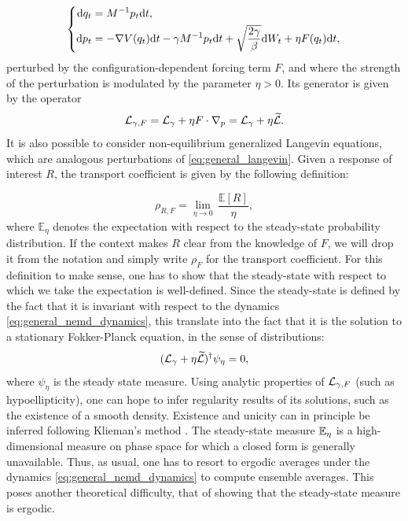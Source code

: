\begin{equation}
    \label{eq:general_nemd_dynamics}
    \left\{\begin{aligned}
        \text dq_t&=M^{-1}p_t\mathrm{d}t,\\
        \text dp_t&= -\nabla V(q_t)\mathrm{d}t -\gamma M^{-1}p_t\mathrm{d}t+\sqrt{\frac{2\gamma}\beta}\text dW_t +\eta F(q_t)\mathrm{d} t,
    \end{aligned}\right.
\end{equation}
perturbed by the configuration-dependent forcing term $F$, and where the strength of the perturbation is modulated by the parameter $\eta>0$.
Its generator is given by the operator 
\begin{equation}
    \label{eq:nemd_generator}
    \mathcal{L}_{\gamma,F}=\mathcal{L}_\gamma +\eta F\cdot \nabla_p = \mathcal{L}_\gamma +\eta \widetilde{\mathcal{L}}.
\end{equation}
It is also possible to consider non-equilibrium generalized Langevin equations, which are analogous perturbations of \eqref{eq:general_langevin}.
Given a response of interest $R$, the transport coefficient is given by the following definition:

\begin{equation}
    \label{eq:transport_coefficient}
    \rho_{R,F}=\underset{\eta \to 0}{\lim}\, \frac{\mathbb{E}[R]}{\eta},
\end{equation}
where $\mathbb{E}_\eta$ denotes the expectation with respect to the steady-state probability distribution. 
If the context makes $R$ clear from the knowledge of $F$, we will drop it from the notation and simply write $\rho_F$ for the transport coefficient.
For this definition to make sense, one has to show that the steady-state with respect to which we take the expectation is well-defined.
Since the steady-state is defined by the fact that it is invariant with respect to the dynamics \eqref{eq:general_nemd_dynamics}, 
this translate into the fact that it is the solution to a stationary Fokker-Planck equation, in the sense of distributions:
\begin{equation}
    \label{eq:nemd_fp_equation}
    (\mathcal{L}_\gamma +\eta \widetilde{\mathcal{L}})^\dagger \psi_\eta = 0,
\end{equation}
where $\psi_\eta$ is the steady state measure. Using analytic properties of $\mathcal{L}_{\gamma,F}$ (such as hypoellipticity), one can hope to infer regularity results of its solutions, such as the existence of a smooth density.
Existence and unicity can in principle be inferred following Klieman's method \cite{K87}. 
The steady-state measure $\mathbb{E}_\eta$ is a high-dimensional measure on phase space for which a closed form is generally unavailable.
 Thus, as usual, one has to resort to ergodic averages under the dynamics \eqref{eq:general_nemd_dynamics} to compute ensemble averages.
 This poses another theoretical difficulty, that of showing that the steady-state measure is ergodic.

